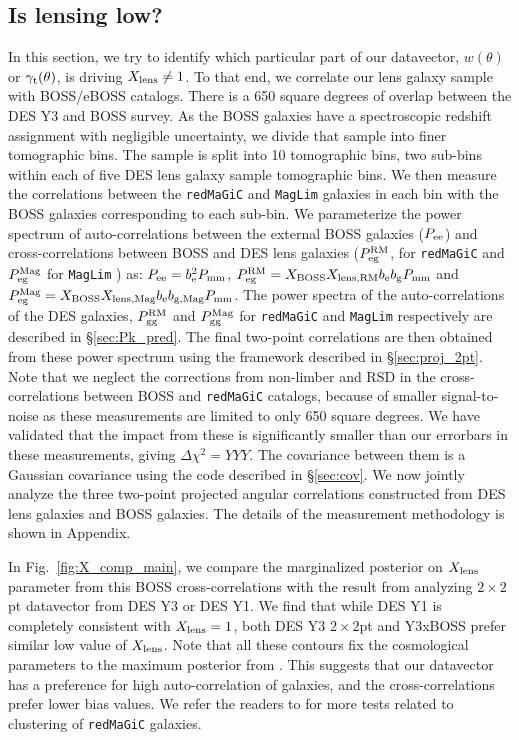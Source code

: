 \documentclass[fleqn,usenatbib]{mnras}
\newcommand{\gammat}{\ensuremath{\gamma_{\rm t}(\theta)}}
\newcommand{\wtheta}{\ensuremath{w(\theta)}}
\newcommand{\redmagic}{\texttt{redMaGiC} }
\newcommand{\maglim}{\texttt{MagLim} }
\newcommand{\blue}[1]{\textcolor{blue}{#1}}
\begin{document}
\subsection{Is lensing low?}
\label{sec:boss_x}
In this section, we try to identify which particular part of our datavector, $\wtheta$ or $\gammat$, is driving $X_{\rm lens} \neq 1$. To that end, we correlate our lens galaxy sample with BOSS/eBOSS catalogs. There is a 650 square degrees of overlap between the DES Y3 and BOSS survey. As the BOSS galaxies have a spectroscopic redshift assignment with negligible uncertainty, we divide that sample into finer tomographic bins. The sample is split into 10 tomographic bins, two sub-bins within each of five DES lens galaxy sample tomographic bins. We then measure the correlations between the \redmagic and \maglim galaxies in each bin with the BOSS galaxies corresponding to each sub-bin. We parameterize the power spectrum of auto-correlations between the external BOSS galaxies ($P_{\rm ee}$) and cross-correlations between BOSS and DES lens galaxies ($P^{\rm RM}_{\rm eg}$, for \redmagic and $P^{\rm Mag}_{\rm eg}$ for \maglim) as: $P_{\rm ee} = b^2_{\rm e} P_{\rm mm}$, $P^{\rm RM}_{\rm eg} = X_{\rm BOSS} X_{\rm lens, RM} b_{\rm e} b_{\rm g} P_{\rm mm}$ and $P^{\rm Mag}_{\rm eg} = X_{\rm BOSS} X_{\rm lens, Mag} b_{\rm e} b_{\rm g, Mag} P_{\rm mm}$. The power spectra of the auto-correlations of the DES galaxies, $P^{\rm RM}_{\rm gg}$ and $P^{\rm Mag}_{\rm gg}$ for \redmagic and \maglim respectively are described in \S\ref{sec:Pk_pred}. The final two-point correlations are then obtained from these power spectrum using the framework described in \S\ref{sec:proj_2pt}. Note that we neglect the corrections from non-limber and RSD in the cross-correlations between BOSS and \redmagic catalogs, because of smaller signal-to-noise as these measurements are limited to only 650 square degrees. We have validated that the impact from these is significantly smaller than our errorbars in these measurements, giving $\Delta \chi^2 = YYY$. The covariance between them is a Gaussian covariance using the code described in \S\ref{sec:cov}. We now jointly analyze the three two-point projected angular correlations constructed from DES lens galaxies and BOSS galaxies. The details of the measurement methodology is shown in Appendix.


In Fig.~\ref{fig:X_comp_main}, we compare the marginalized posterior on $X_{\rm lens}$ parameter from this BOSS cross-correlations with the result from analyzing $2\times2$pt datavector from DES Y3 or DES Y1. We find that while DES Y1 is completely consistent with $X_{\rm lens} = 1$, both DES Y3 $2\times2$pt and Y3xBOSS prefer similar low value of $X_{\rm lens}$. Note that all these contours fix the cosmological parameters to the maximum posterior from \citet{Abbott_2018}. This suggests that our datavector has a preference for high auto-correlation of galaxies, and the cross-correlations prefer lower bias values. We refer the readers to \citet{y3-galaxyclustering} for more tests related to clustering of \redmagic galaxies. 
\end{document}
